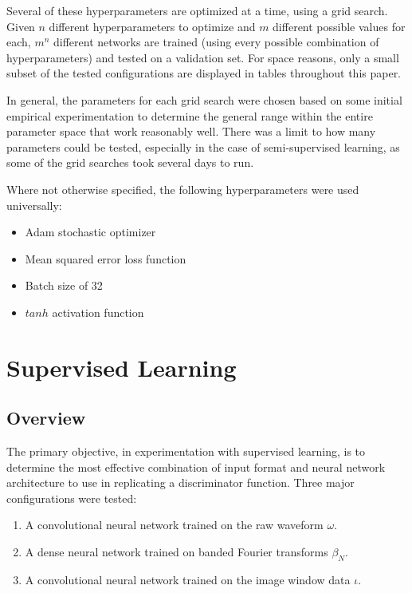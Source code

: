 \documentclass[10pt]{article}
\begin{document}
Several of these hyperparameters are optimized at a time, using a grid search. Given $n$ different hyperparameters to optimize and $m$ different possible values for each, $m^n$ different networks are trained (using every possible combination of hyperparameters) and tested on a validation set. For space reasons, only a small subset of the tested configurations are displayed in tables throughout this paper.

In general, the parameters for each grid search were chosen based on some initial empirical experimentation to determine the general range within the entire parameter space that work reasonably well. There was a limit to how many parameters could be tested, especially in the case of semi-supervised learning, as some of the grid searches took several days to run.

Where not otherwise specified, the following hyperparameters were used universally:
\begin{itemize}
    \item Adam \cite{adam} stochastic optimizer
    \item Mean squared error loss function
    \item Batch size of 32
    \item $tanh$ activation function
\end{itemize}

\section{Supervised Learning}

\subsection{Overview}

The primary objective, in experimentation with supervised learning, is to determine the most effective combination of input format and neural network architecture to use in replicating a discriminator function. Three major configurations were tested:

\begin{enumerate}
    \item A convolutional neural network trained on the raw waveform $\omega$.
    \item A dense neural network trained on banded Fourier transforms $\beta_{N}$.
    \item A convolutional neural network trained on the image window data $\iota$.
\end{enumerate}
\end{document}
